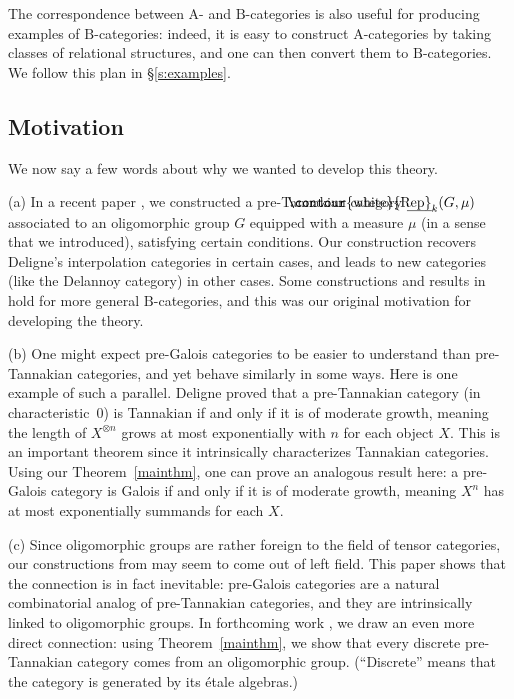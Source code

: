 \documentclass[12pt]{amsart}
\numberwithin{equation}{section}
\theoremstyle{definition}
\newcommand{\rA}{\mathrm{A}}
\newcommand{\rB}{\mathrm{B}}
\newcommand{\myuline}[1]{%
  \uline{\phantom{#1}}%
  \llap{\contour{white}{#1}}%
}
\DeclareMathOperator{\uRep}{\text{\myuline{\rm Rep}}}
\begin{document}
The correspondence between $\rA$- and $\rB$-categories is also useful for producing examples of $\rB$-categories: indeed, it is easy to construct $\rA$-categories by taking classes of relational structures, and one can then convert them to $\rB$-categories. We follow this plan in \S \ref{s:examples}.

\subsection{Motivation}

We now say a few words about why we wanted to develop this theory.

(a) In a recent paper \cite{repst}, we constructed a pre-Tannakian category $\uRep_k(G,\mu)$ associated to an oligomorphic group $G$ equipped with a measure $\mu$ (in a sense that we introduced), satisfying certain conditions. Our construction recovers Deligne's interpolation categories in certain cases, and leads to new categories (like the Delannoy category) in other cases. Some constructions and results in \cite{repst} hold for more general $\rB$-categories, and this was our original motivation for developing the theory.

(b) One might expect pre-Galois categories to be easier to understand than pre-Tannakian categories, and yet behave similarly in some ways. Here is one example of such a parallel. Deligne \cite{Deligne2} proved that a pre-Tannakian category (in characteristic~0) is Tannakian if and only if it is of moderate growth, meaning the length of $X^{\otimes n}$ grows at most exponentially with $n$ for each object $X$. This is an important theorem since it intrinsically characterizes Tannakian categories. Using our Theorem~\ref{mainthm}, one can prove an analogous result here: a pre-Galois category is Galois if and only if it is of moderate growth, meaning $X^n$ has at most exponentially summands for each $X$.

(c) Since oligomorphic groups are rather foreign to the field of tensor categories, our constructions from \cite{repst} may seem to come out of left field. This paper shows that the connection is in fact inevitable: pre-Galois categories are a natural combinatorial analog of pre-Tannakian categories, and they are intrinsically linked to oligomorphic groups. In forthcoming work \cite{frobalg}, we draw an even more direct connection: using Theorem~\ref{mainthm}, we show that every discrete pre-Tannakian category comes from an oligomorphic group. (``Discrete'' means that the category is generated by its \'etale algebras.)
\end{document}
